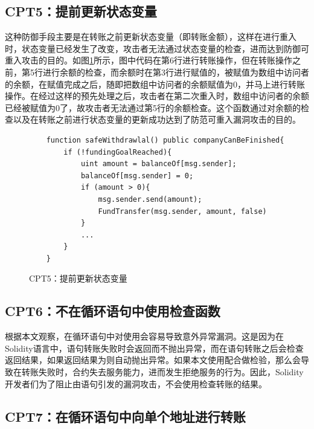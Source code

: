 \subsection{CPT5：提前更新状态变量}
这种防御手段主要是在转账之前更新状态变量（即转账金额），这样在进行重入时，状态变量已经发生了改变，攻击者无法通过状态变量的检查，进而达到防御可重入攻击的目的。如图\ref{fig:ss5_example}所示，图中代码在第6行进行转账操作，但在转账操作之前，第5行进行余额的检查，而余额时在第3行进行赋值的，被赋值为数组中访问者的余额，在赋值完成之后，随即把数组中访问者的余额赋值为0，并马上进行转账操作。在经过这样的预先处理之后，攻击者在第二次重入时，数组中访问者的余额已经被赋值为0了，故攻击者无法通过第5行的余额检查。这个函数通过对余额的检查以及在转账之前进行状态变量的更新成功达到了防范可重入漏洞攻击的目的。
\begin{figure}
\begin{minipage}[htbp]{1.0\linewidth}
    \begin{lstlisting}
    function safeWithdrawlal() public companyCanBeFinished{
        if (!fundingGoalReached){
            uint amount = balanceOf[msg.sender];
            balanceOf[msg.sender] = 0;
            if (amount > 0){
                msg.sender.send(amount);
                FundTransfer(msg.sender, amount, false)
            }
            ...
        }
    }
    \end{lstlisting}
\end{minipage}
\vspace{-5mm}
\caption{CPT5：提前更新状态变量}
\label{fig:ss5_example}
\end{figure}

\subsection{CPT6：不在循环语句中使用检查函数}\label{sec:ss6}

根据本文观察，在循环语句中对使用会容易导致意外异常漏洞。这是因为在Solidity语言中，语句转账失败时会返回而不抛出异常，而在语句转账之后会检查返回结果，如果返回结果为则自动抛出异常。如果本文使用配合做检验，那么会导致在转账失败时，合约失去服务能力，进而发生拒绝服务的行为。因此，Solidity开发者们为了阻止由语句引发的漏洞攻击，不会使用检查转账的结果。

\subsection{CPT7：在循环语句中向单个地址进行转账}\label{sec:ss7}

